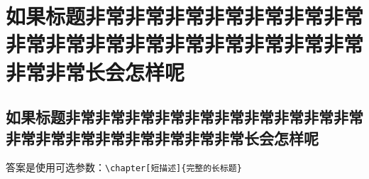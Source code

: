\documentclass[degree=mf]{njuthesis}
\begin{document}
\maketitle 




\tableofcontents
\listoffigures
\listoftables

\mainmatter


\chapter[非常长的标题不好看]{如果标题非常非常非常非常非常非常非常非常非常非常非常非常非常非常非常非常非常非常长会怎样呢}
\section[还是用短点的吧]{如果标题非常非常非常非常非常非常非常非常非常非常非常非常非常非常非常非常非常非常长会怎样呢}
答案是使用可选参数：\verb+\chapter[短描述]{完整的长标题}+

\zhlipsum[1-20][name=zhufu]





\printbibliography



\appendix



\end{document}
